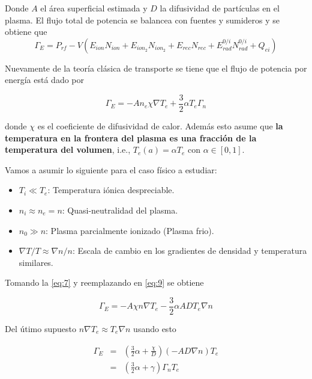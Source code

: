 \documentclass[11pt]{article}
\theoremstyle{definition}
\begin{document}
  Donde $A$ el \'area superficial estimada y $D$ la difusividad de part\'iculas en el plasma. El flujo total de potencia se balancea con fuentes y sumideros y se obtiene que 
  \begin{equation}\label{eq:8}
    \Gamma_E = P_{rf} - V(E_{ion}N_{ion} + E_{ion_2}N_{ion_2} + E_{rec}N_{rec} + E_{rad}^{0/i}N_{rad}^{0/i} + Q_{ei})
  \end{equation}

  Nuevamente de la teor\'ia cl\'asica de transporte se tiene que el flujo de potencia por energ\'ia est\'a dado por

  \begin{equation}\label{eq:9}
    \Gamma_E = -An_e\chi\nabla T_e + \frac{3}{2}\alpha T_e\Gamma_n
  \end{equation}

  donde $\chi$ es el coeficiente de difusividad de calor. Adem\'as esto asume que \textbf{la temperatura en la frontera del plasma es una fracci\'on de la temperatura del volumen}, i.e., $T_e(a) = \alpha T_e$ con $\alpha \in [0,1]$.
  
  Vamos a asumir lo siguiente para el caso f\'isico a estudiar:

  \begin{itemize}
    \item $T_i \ll T_e$: Temperatura i\'onica despreciable.
    \item $n_i \approx n_e = n$: Quasi-neutralidad del plasma.
    \item $n_0 \gg n$: Plasma parcialmente ionizado (Plasma frio).
    \item $\nabla T/ T \approx \nabla n / n$: Escala de cambio en los gradientes de densidad y temperatura similares.
  \end{itemize}
  
  Tomando la \eqref{eq:7} y reemplazando en \eqref{eq:9} se obtiene 

  \begin{equation}
    \Gamma_E = -A\chi n \nabla T_e - \frac{3}{2}\alpha ADT_e\nabla n
  \end{equation}

  Del \'utimo supuesto $n \nabla T_e \approx T_e \nabla n$ usando esto

  \begin{eqnarray}\label{eq:11}
    \Gamma_E &=& \left(\frac{3}{2}\alpha + \frac{\chi}{D}\right)(-AD\nabla n)T_e \nonumber \\
             &=& \left(\frac{3}{2}\alpha + \gamma\right)\Gamma_n T_e
  \end{eqnarray}
\end{document}
